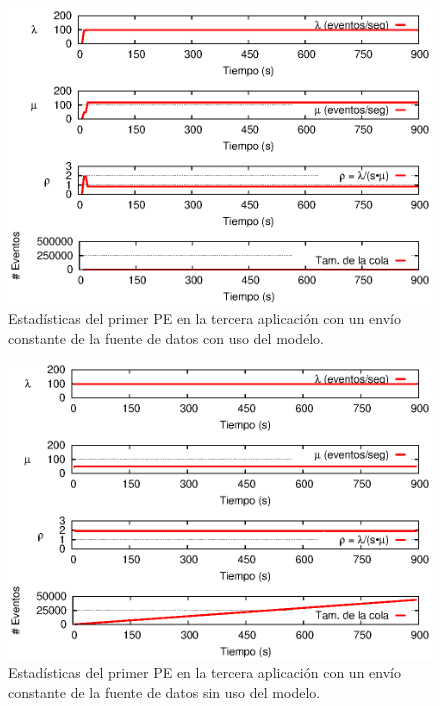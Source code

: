 \begin{figure}[!htp]
\centering
    \includegraphics[scale=1]{images/exp/app3/cm/logical/statusOnePE.eps}
    \caption{Estad\'isticas del primer PE en la tercera aplicaci\'on con un env\'io constante de la fuente de datos con uso del modelo.}
    \label{fig:app3-statusOnePE-cm}
\end{figure}

\begin{figure}[!htp]
\centering
    \includegraphics[scale=1]{images/exp/app3/sm/logical/statusOnePE.eps}
    \caption{Estad\'isticas del primer PE en la tercera aplicaci\'on con un env\'io constante de la fuente de datos sin uso del modelo.}
    \label{fig:app3-statusOnePE-sm}
\end{figure}

